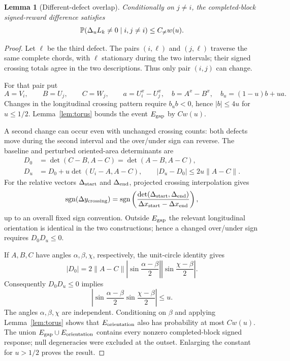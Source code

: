 \documentclass[11pt]{article}
\newtheorem{lemma}[theorem]{Lemma}
\theoremstyle{remark}\newtheorem{remark}[theorem]{Remark}
\begin{document}
\begin{lemma}[Different-defect overlap]\label{lem:other}
Conditionally on $j\ne i$, the completed-block signed-reward difference satisfies
\[\mathbb P(\Delta_u L_k\ne0\mid i,j\ne i)\le C_{\ne}w(u).\]
\end{lemma}
\begin{proof}
Let $\ell$ be the third defect. The pairs $(i,\ell)$ and $(j,\ell)$ traverse the same complete chords, with $\ell$ stationary during the two intervals; their signed crossing totals agree in the two descriptions. Thus only pair $(i,j)$ can change.

For that pair put
\[A=V_i,\qquad B=U_j,\qquad C=W_j,\qquad a=U_i^x-U_j^x,\quad b=A^x-B^x,\quad b_u=(1-u)b+ua.\]
Changes in the longitudinal crossing pattern require $b_ub<0$, hence $|b|\le4u$ for $u\le1/2$. Lemma~\ref{lem:torus} bounds the event $E_{\rm gap}$ by $Cw(u)$.

A second change can occur even with unchanged crossing counts: both defects move during the second interval and the over/under sign can reverse. The baseline and perturbed oriented-area determinants are
\begin{align}\label{eq:Ddet}
D_0&=\det(C-B,A-C)=\det(A-B,A-C),\\
D_u&=D_0+u\det(U_i-A,A-C),\qquad |D_u-D_0|\le2u\|A-C\|.
\end{align}
For the relative vectors $\Delta_{\rm start}$ and $\Delta_{\rm end}$,
projected crossing interpolation gives
\[
\operatorname{sgn}(\Delta y_{\rm crossing})
=\operatorname{sgn}\left(
\frac{\det(\Delta_{\rm start},\Delta_{\rm end})}
{\Delta x_{\rm start}-\Delta x_{\rm end}}
\right),
\]
up to an overall fixed sign convention. Outside $E_{\rm gap}$ the relevant longitudinal orientation is identical in the two constructions; hence a changed over/under sign requires $D_0D_u\le0$.

If $A,B,C$ have angles $\alpha,\beta,\chi$, respectively, the unit-circle identity gives
\begin{equation}\label{eq:detproduct}
|D_0|=2\|A-C\|\left|\sin\frac{\alpha-\beta}{2}\right|\left|\sin\frac{\chi-\beta}{2}\right|.
\end{equation}
Consequently $D_0D_u\le0$ implies
\[\left|\sin\frac{\alpha-\beta}{2}\sin\frac{\chi-\beta}{2}\right|\le u.\]
The angles $\alpha,\beta,\chi$ are independent. Conditioning on $\beta$ and applying Lemma~\ref{lem:torus} shows that $E_{\rm orientation}$ also has probability at most $Cw(u)$. The union $E_{\rm gap}\cup E_{\rm orientation}$ contains every nonzero completed-block signed response; null degeneracies were excluded at the outset. Enlarging the constant for $u>1/2$ proves the result.
\end{proof}
\end{document}
